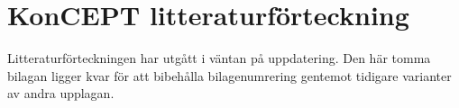 \onecolumn
\chapter{KonCEPT litteraturförteckning}
\label{konceptlitteratur}

\noindent Litteraturförteckningen har utgått i väntan på uppdatering.
Den här tomma bilagan ligger kvar för att bibehålla bilagenumrering
gentemot tidigare varianter av andra upplagan.

\twocolumn











